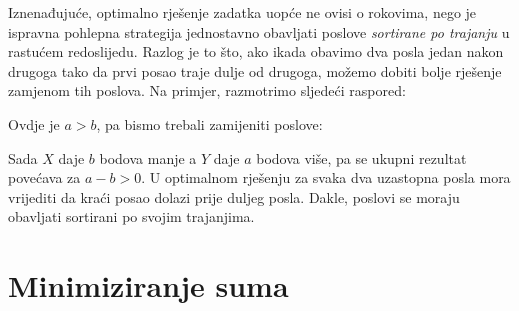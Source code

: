 Iznenađujuće, optimalno rješenje zadatka
uopće ne ovisi o rokovima,
nego je ispravna pohlepna strategija jednostavno
obavljati poslove \emph{sortirane po trajanju}
u rastućem redoslijedu.
Razlog je to što, ako ikada obavimo
dva posla jedan nakon drugoga tako da prvi posao
traje dulje od drugoga,
možemo dobiti bolje rješenje zamjenom tih poslova.
Na primjer, razmotrimo sljedeći raspored:
\begin{center}
\end{center}
Ovdje je $a>b$, pa bismo trebali zamijeniti poslove:
\begin{center}
\end{center}
Sada $X$ daje $b$ bodova manje a $Y$ daje $a$ bodova više,
pa se ukupni rezultat povećava za $a-b > 0$.
U optimalnom rješenju
za svaka dva uzastopna posla
mora vrijediti da kraći posao dolazi
prije duljeg posla.
Dakle, poslovi se moraju obavljati
sortirani po svojim trajanjima.

\section{Minimiziranje suma}

